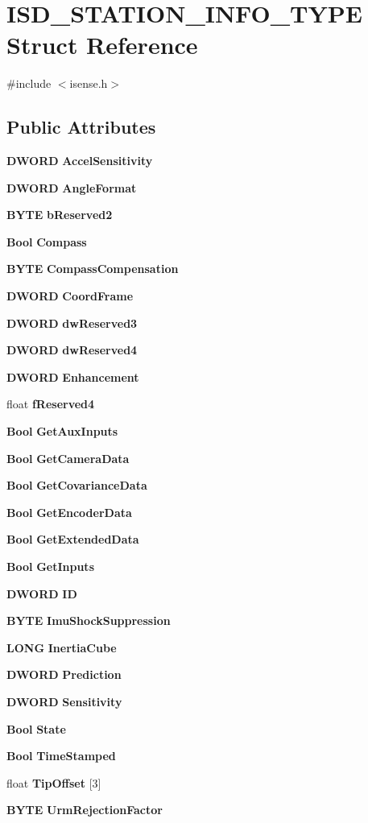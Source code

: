 \section{\-I\-S\-D\-\_\-\-S\-T\-A\-T\-I\-O\-N\-\_\-\-I\-N\-F\-O\-\_\-\-T\-Y\-P\-E \-Struct \-Reference}
\label{structISD__STATION__INFO__TYPE}


{\ttfamily \#include $<$isense.\-h$>$}

\subsection*{\-Public \-Attributes}
\begin{DoxyCompactItemize}
\item 
{\bf \-D\-W\-O\-R\-D} {\bf \-Accel\-Sensitivity}
\item 
{\bf \-D\-W\-O\-R\-D} {\bf \-Angle\-Format}
\item 
{\bf \-B\-Y\-T\-E} {\bf b\-Reserved2}
\item 
{\bf \-Bool} {\bf \-Compass}
\item 
{\bf \-B\-Y\-T\-E} {\bf \-Compass\-Compensation}
\item 
{\bf \-D\-W\-O\-R\-D} {\bf \-Coord\-Frame}
\item 
{\bf \-D\-W\-O\-R\-D} {\bf dw\-Reserved3}
\item 
{\bf \-D\-W\-O\-R\-D} {\bf dw\-Reserved4}
\item 
{\bf \-D\-W\-O\-R\-D} {\bf \-Enhancement}
\item 
float {\bf f\-Reserved4}
\item 
{\bf \-Bool} {\bf \-Get\-Aux\-Inputs}
\item 
{\bf \-Bool} {\bf \-Get\-Camera\-Data}
\item 
{\bf \-Bool} {\bf \-Get\-Covariance\-Data}
\item 
{\bf \-Bool} {\bf \-Get\-Encoder\-Data}
\item 
{\bf \-Bool} {\bf \-Get\-Extended\-Data}
\item 
{\bf \-Bool} {\bf \-Get\-Inputs}
\item 
{\bf \-D\-W\-O\-R\-D} {\bf \-I\-D}
\item 
{\bf \-B\-Y\-T\-E} {\bf \-Imu\-Shock\-Suppression}
\item 
{\bf \-L\-O\-N\-G} {\bf \-Inertia\-Cube}
\item 
{\bf \-D\-W\-O\-R\-D} {\bf \-Prediction}
\item 
{\bf \-D\-W\-O\-R\-D} {\bf \-Sensitivity}
\item 
{\bf \-Bool} {\bf \-State}
\item 
{\bf \-Bool} {\bf \-Time\-Stamped}
\item 
float {\bf \-Tip\-Offset} [3]
\item 
{\bf \-B\-Y\-T\-E} {\bf \-Urm\-Rejection\-Factor}
\end{DoxyCompactItemize}


